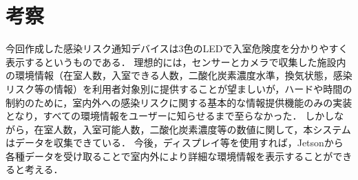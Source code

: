 
\section{考察}

今回作成した感染リスク通知デバイスは3色のLEDで入室危険度を分かりやすく表示するというものである．
理想的には，センサーとカメラで収集した施設内の環境情報（在室人数，入室できる人数，二酸化炭素濃度水準，換気状態，感染リスク等の情報）を利用者対象別に提供することが望ましいが，ハードや時間の制約のために，室内外への感染リスクに関する基本的な情報提供機能のみの実装となり，すべての環境情報をユーザーに知らせるまで至らなかった．
しかしながら，在室人数，入室可能人数，二酸化炭素濃度等の数値に関して，本システムはデータを収集できている．
今後，ディスプレイ等を使用すれば，Jetsonから各種データを受け取ることで室内外により詳細な環境情報を表示することができると考える．
